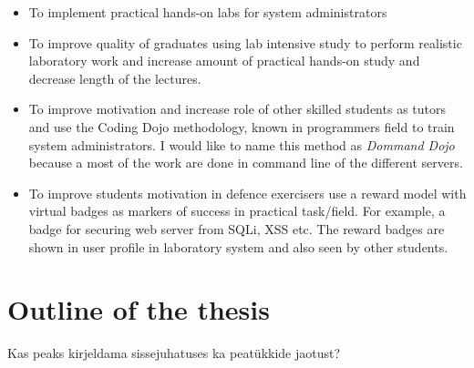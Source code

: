 \begin{itemize}
\item To implement practical hands-on labs for system administrators
\item To improve quality of graduates using lab intensive study  to perform realistic laboratory work and increase amount of practical hands-on study and decrease length of the lectures.
\item To improve motivation and increase role of other skilled students as tutors and use the \gls{Coding Dojo} methodology, known in programmers field to train system administrators. I would like to name this method as \emph{Dommand Dojo} because a most of the work are done in command line of the different servers.
\item To improve students motivation in defence exercisers use a reward model with virtual badges as markers of success in practical task/field. For example, a badge for securing web server from \gls{SQLi}, \gls{XSS} etc. The reward badges are shown in user profile in laboratory system and also seen by other students.
\end{itemize}
\par


\section{Outline of the thesis}
{\color{red} Kas peaks kirjeldama sissejuhatuses ka peatükkide jaotust? }

 
